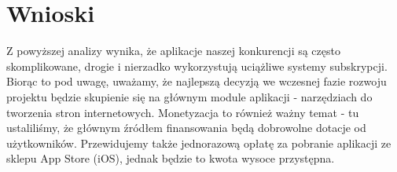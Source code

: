 \section{Wnioski}
Z powyższej analizy wynika, że aplikacje naszej konkurencji są często skomplikowane, drogie i nierzadko wykorzystują uciążliwe systemy subskrypcji. Biorąc to pod uwagę, uważamy, że najlepszą decyzją we wczesnej fazie rozwoju projektu będzie skupienie się na głównym module aplikacji - narzędziach do tworzenia stron internetowych. Monetyzacja to również ważny temat - tu ustaliliśmy, że głównym źródłem finansowania będą dobrowolne dotacje od użytkowników. Przewidujemy także jednorazową opłatę za pobranie aplikacji ze sklepu App Store (iOS), jednak będzie to kwota wysoce przystępna.